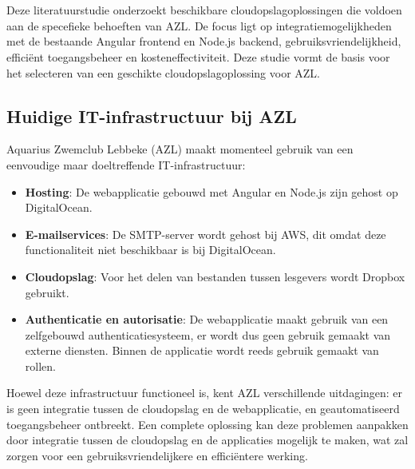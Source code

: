 \chapter{}%
\label{ch:stand-van-zaken}



Deze literatuurstudie onderzoekt beschikbare cloudopslagoplossingen die voldoen aan de specefieke behoeften van AZL. 
De focus ligt op integratiemogelijkheden met de bestaande Angular frontend en Node.js backend, gebruiksvriendelijkheid, efficiënt toegangsbeheer en kosteneffectiviteit. 
Deze studie vormt de basis voor het selecteren van een geschikte cloudopslagoplossing voor AZL.

\section{Huidige IT-infrastructuur bij AZL}
Aquarius Zwemclub Lebbeke (AZL) maakt momenteel gebruik van een eenvoudige maar doeltreffende IT-infrastructuur:
\begin{itemize}
    \item \textbf{Hosting}: De webapplicatie gebouwd met Angular en Node.js zijn gehost op DigitalOcean.
    \item \textbf{E-mailservices}: De SMTP-server wordt gehost bij AWS, dit omdat deze functionaliteit niet beschikbaar is bij DigitalOcean.
    \item \textbf{Cloudopslag}: Voor het delen van bestanden tussen lesgevers wordt Dropbox gebruikt.
    \item \textbf{Authenticatie en autorisatie}: De webapplicatie maakt gebruik van een zelfgebouwd authenticatiesysteem, er wordt dus geen gebruik gemaakt van externe diensten. Binnen de applicatie wordt reeds gebruik gemaakt van rollen.
\end{itemize}
Hoewel deze infrastructuur functioneel is, kent AZL verschillende uitdagingen: er is geen integratie tussen de cloudopslag en de 
webapplicatie, en geautomatiseerd toegangsbeheer ontbreekt. Een complete oplossing kan deze problemen aanpakken 
door integratie tussen de cloudopslag en de applicaties mogelijk te maken, wat zal zorgen voor een gebruiksvriendelijkere en efficiëntere werking.

